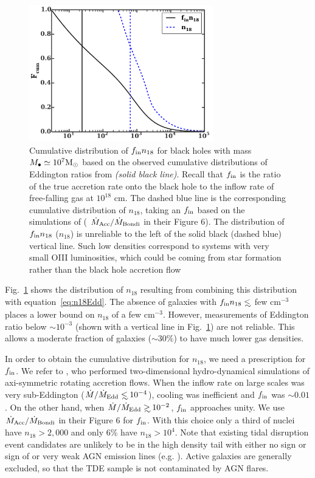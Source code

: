 \documentclass[usenatbib,fleqn]{mnras}
\newcommand\lsim{\mathrel{\rlap{\lower4pt\hbox{\hskip1pt$\sim$}}
    \raise1pt\hbox{$<$}}}
\newcommand\gsim{\mathrel{\rlap{\lower4pt\hbox{\hskip1pt$\sim$}}
    \raise1pt\hbox{$>$}}}
\newcommand{\Mbh}[1][]{M_{\bullet#1}}
\newcommand{\Msun}{{\rm M_\odot}}
\begin{document}
\begin{figure}
\includegraphics[width=8cm]{fcum_n18.pdf}
\caption{\label{fig:n18Cum} Cumulative distribution of $f_{\rm in}
  n_{18}$ for black holes with mass $\Mbh\simeq 10^{7} \Msun$ based on
  the observed cumulative distributions of Eddington ratios from
  \citet{Kauffmann+2009} {\it (solid black line)}. Recall that $f_{\rm
    in}$ is the ratio of the true accretion rate onto the black hole
  to the inflow rate of free-falling gas at $10^{18}$ cm.  The dashed
  blue line is the corresponding cumulative distribution of $n_{18}$,
  taking an $f_{\rm in}$ based on the simulations of \citet{Li+2013} (
  $\dot{M}_{\rm Acc}/\dot{M}_{\rm Bondi}$ in their Figure 6). The
  distribution of $f_{\rm in} n_{18}$ ($n_{18}$) is unreliable to the
  left of the solid black (dashed blue) vertical line. Such low
  densities correspond to systems with very small OIII luminosities,
  which could be coming from star formation rather than the black hole
  accretion flow}
\end{figure}


Fig.~\ref{fig:n18Cum} shows the distribution of $n_{18}$ resulting
from combining this distribution with equation~\eqref{eq:n18Edd}.  The
absence of galaxies with $f_{\rm in }n_{18} \lsim$ few cm$^{-3}$
places a lower bound on $n_{18}$ of a few cm$^{-3}$.  However,
measurements of Eddington ratio below $\sim 10^{-3}$ (shown with a
vertical line in Fig.~\ref{fig:n18Cum}) are not reliable. This allows a
moderate fraction of galaxies ($\sim 30\%$) to have much lower gas
densities.


In order to obtain the cumulative distribution for $n_{18}$, we need a
prescription for $f_{\rm in}$. We refer to \citet{Li+2013}, who
performed two-dimensional hydro-dynamical simulations of axi-symmetric
rotating accretion flows. When the inflow rate on large scales was
very sub-Eddington ($\dot{M}/\dot{M}_{\rm Edd} \lsim 10^{-4}$),
cooling was inefficient and $f_{\rm in}$ was $\sim 0.01$. On the other
hand, when $\dot{M}/\dot{M}_{\rm Edd}\gsim 10^{-2}$, $f_{\rm in}$
approaches unity.  We use $\dot{M}_{\rm Acc}/\dot{M}_{\rm Bondi}$ in
their Figure 6 for $f_{\rm in}$.  With this choice only a third of
nuclei have $n_{18}>2,000$ and only 6\% have $n_{18}>10^{4}$. Note
that existing tidal disruption event candidates are unlikely to be in
the high density tail with either no sign or sign of or very weak AGN
emission lines (e.g. \citealt{van-Velzen+2011, Arcavi+2014}). Active
galaxies are generally excluded, so that the TDE sample is not
contaminated by AGN flares.
\end{document}
